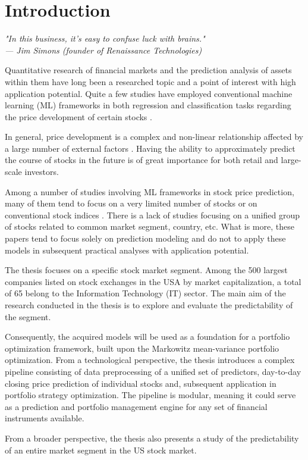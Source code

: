 \chapter*{Introduction} %

\begin{flushright}
\itshape
"In this business, it's easy to confuse luck with brains."\\
--- Jim Simons (founder of Renaissance Technologies)
\end{flushright}

Quantitative research of financial markets and the prediction analysis of assets within them have long been
a researched topic and a point of interest with high application potential. 
Quite a few studies have employed conventional machine learning (ML) frameworks in both regression and classification tasks 
regarding the price development of certain stocks \cite{review}.

In general, price development is a complex and non-linear relationship affected by a large number of external factors \cite{konferencia1}. Having the ability 
to approximately predict the course of stocks in the future is of great importance for both retail and large-scale investors. 

Among a number of studies involving ML frameworks in stock price prediction, many of them tend to focus on a very limited number of stocks \cite{clanok5, konferencia1} or on
conventional stock indices \cite{krauss}. There is a lack of studies focusing on a unified group of stocks related to common market segment, country, etc. What is more, these papers tend to 
focus solely on prediction modeling and do not to apply these models in subsequent practical analyses with application potential.

The thesis focuses on a specific stock market segment. Among the 500 largest companies listed on stock exchanges in the USA by market capitalization, a total of 65 belong to the Information Technology (IT) sector.
The main aim of the research conducted in the thesis is to explore and evaluate the predictability of the segment.

Consequently, the acquired models will be used as a foundation for a portfolio optimization framework, built upon the Markowitz mean-variance portfolio optimization. From a technological perspective, the thesis introduces a complex pipeline
consisting of data preprocessing of a unified set of predictors, day-to-day closing price prediction of individual stocks and, subsequent application in portfolio strategy optimization. The pipeline is modular, meaning it could serve 
as a prediction and portfolio management engine for any set of financial instruments available.

From a broader perspective, the thesis also presents a study of the predictability of an entire market segment in the US stock market.

